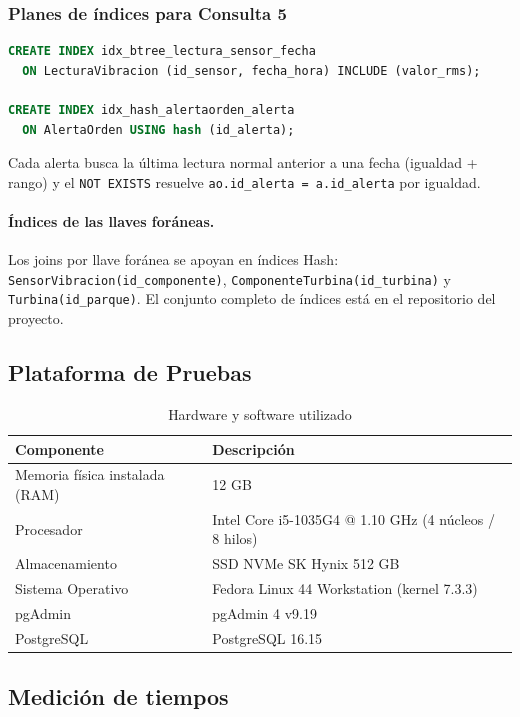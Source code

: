 \subsubsection{Planes de índices para Consulta 5}
\begin{lstlisting}[language=SQL]
CREATE INDEX idx_btree_lectura_sensor_fecha
  ON LecturaVibracion (id_sensor, fecha_hora) INCLUDE (valor_rms);

CREATE INDEX idx_hash_alertaorden_alerta
  ON AlertaOrden USING hash (id_alerta);
\end{lstlisting}
Cada alerta busca la última lectura normal anterior a una fecha (igualdad +
rango) y el \texttt{NOT EXISTS} resuelve \texttt{ao.id\_alerta = a.id\_alerta}
por igualdad.

\paragraph{Índices de las llaves foráneas.} Los joins por llave foránea se apoyan en índices Hash:
\texttt{SensorVibracion(id\_componente)},
\texttt{ComponenteTurbina(id\_turbina)} y \texttt{Turbina(id\_parque)}. El
conjunto completo de índices está en el repositorio del proyecto.

\subsection{Plataforma de Pruebas}

\begin{table}[H]
\centering
\small
\caption{Hardware y software utilizado}
\begin{tabular}{|l|l|}
\hline
\textbf{Componente} & \textbf{Descripción} \\ \hline
Memoria física instalada (RAM) & 12 GB \\ \hline
Procesador & Intel Core i5-1035G4 @ 1.10 GHz (4 núcleos / 8 hilos) \\ \hline
Almacenamiento & SSD NVMe SK Hynix 512 GB \\ \hline
Sistema Operativo & Fedora Linux 44 Workstation (kernel 7.3.3) \\ \hline
pgAdmin & pgAdmin 4 v9.19 \\ \hline
PostgreSQL & PostgreSQL 16.15 \\ \hline
\end{tabular}
\end{table}

\subsection{Medición de tiempos}

